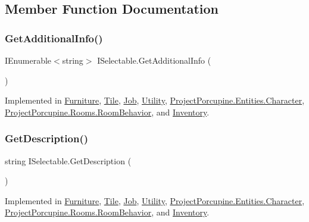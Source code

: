 \subsection{Member Function Documentation}
\mbox{\label{interface_i_selectable_a337f81bfa99bb254bb2f7de6a8b5cd4b}} 
\subsubsection{\texorpdfstring{Get\+Additional\+Info()}{GetAdditionalInfo()}}
{\footnotesize\ttfamily I\+Enumerable$<$string$>$ I\+Selectable.\+Get\+Additional\+Info (\begin{DoxyParamCaption}{ }\end{DoxyParamCaption})}



Implemented in \hyperlink{class_furniture_a0834aab5c42424b7c700feeac78a8cc5}{Furniture}, \hyperlink{class_tile_adae7d6b9e3e0e33ed9a398efca024055}{Tile}, \hyperlink{class_job_a12f5c3ebc9277bc67f110ec80287ae37}{Job}, \hyperlink{class_utility_a7b5e30bb3065f9edb004d385019d9c5b}{Utility}, \hyperlink{class_project_porcupine_1_1_entities_1_1_character_a25f40156785cb40c6bfc3496e27262b9}{Project\+Porcupine.\+Entities.\+Character}, \hyperlink{class_project_porcupine_1_1_rooms_1_1_room_behavior_a5e88494dd23269e902c2f5cbe9442d4c}{Project\+Porcupine.\+Rooms.\+Room\+Behavior}, and \hyperlink{class_inventory_a6cf01d5205fb424105c869f28ad66f79}{Inventory}.

\mbox{\label{interface_i_selectable_a1d8947a443b6214cff01f2d75c8bc75a}} 
\subsubsection{\texorpdfstring{Get\+Description()}{GetDescription()}}
{\footnotesize\ttfamily string I\+Selectable.\+Get\+Description (\begin{DoxyParamCaption}{ }\end{DoxyParamCaption})}



Implemented in \hyperlink{class_furniture_af77901f8fc7bfde9ab7dfe55a5bdb57a}{Furniture}, \hyperlink{class_tile_a827ddb92a97dc4f34ab12052127f4d3b}{Tile}, \hyperlink{class_job_a03ba4d976ec78d3e36b6ac7f5124ca06}{Job}, \hyperlink{class_utility_a1571ffbfff4e7b254842e7078e5725e0}{Utility}, \hyperlink{class_project_porcupine_1_1_entities_1_1_character_aad98e60530da392f0d4ee0efd0d8cb7c}{Project\+Porcupine.\+Entities.\+Character}, \hyperlink{class_project_porcupine_1_1_rooms_1_1_room_behavior_a43beeaa1ce08cced8ee7044e8c97a06d}{Project\+Porcupine.\+Rooms.\+Room\+Behavior}, and \hyperlink{class_inventory_abd4b4e47544f6697bcec6fea62b80fe2}{Inventory}.

